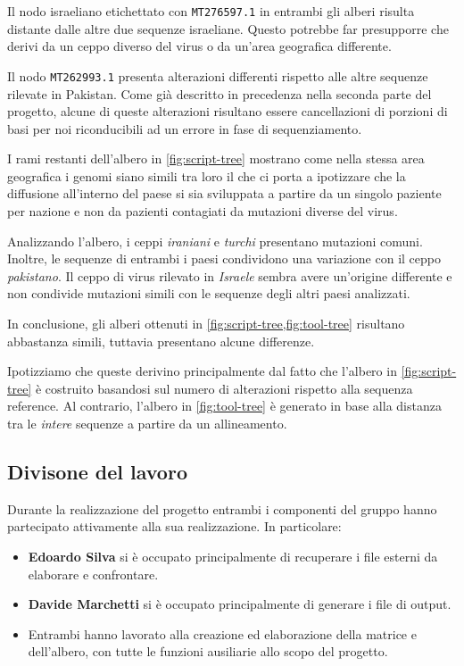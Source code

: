 \documentclass[11pt,italian]{article}
\begin{document}
Il nodo israeliano etichettato con \lstinline{MT276597.1} in entrambi gli alberi risulta distante dalle altre due sequenze israeliane. Questo potrebbe far presupporre che derivi da un ceppo diverso del virus o da un'area geografica differente.

Il nodo \lstinline{MT262993.1} presenta alterazioni differenti rispetto alle altre sequenze rilevate in Pakistan. Come già descritto in precedenza nella seconda parte del progetto, alcune di queste alterazioni risultano essere cancellazioni di porzioni di basi per noi riconducibili ad un errore in fase di sequenziamento.

I rami restanti dell'albero in \cref{fig:script-tree} mostrano come nella stessa area geografica i genomi siano simili tra loro il che ci porta a ipotizzare che la diffusione all'interno del paese si sia sviluppata a partire da un singolo paziente per nazione e non da pazienti contagiati da mutazioni diverse del virus.

Analizzando l'albero, i ceppi \textit{iraniani} e \textit{turchi} presentano mutazioni comuni. Inoltre, le sequenze di entrambi i paesi condividono una variazione con il ceppo \textit{pakistano}.
Il ceppo di virus rilevato in \textit{Israele} sembra avere un'origine differente e non condivide mutazioni simili con le sequenze degli altri paesi analizzati.

\vspace{2mm}
\noindent
In conclusione, gli alberi ottenuti in \cref{fig:script-tree,fig:tool-tree} risultano abbastanza simili, tuttavia presentano alcune differenze.

Ipotizziamo che queste derivino principalmente dal fatto che l'albero in \cref{fig:script-tree} è costruito basandosi sul numero di alterazioni rispetto alla sequenza reference.
Al contrario, l'albero in \cref{fig:tool-tree} è generato in base alla distanza tra le \textit{intere} sequenze a partire da un allineamento.

\newpage
\subsection{Divisone del lavoro}
Durante la realizzazione del progetto entrambi i componenti del gruppo hanno partecipato attivamente alla sua realizzazione. In particolare:
\begin{itemize}
  \item \textbf{Edoardo Silva} si è occupato principalmente di recuperare i file esterni da elaborare e confrontare.
  \item \textbf{Davide Marchetti} si è occupato principalmente di generare i file di output.
  \item Entrambi hanno lavorato alla creazione ed elaborazione della matrice e dell'albero, con tutte le funzioni ausiliarie allo scopo del progetto.
\end{itemize}
\end{document}
